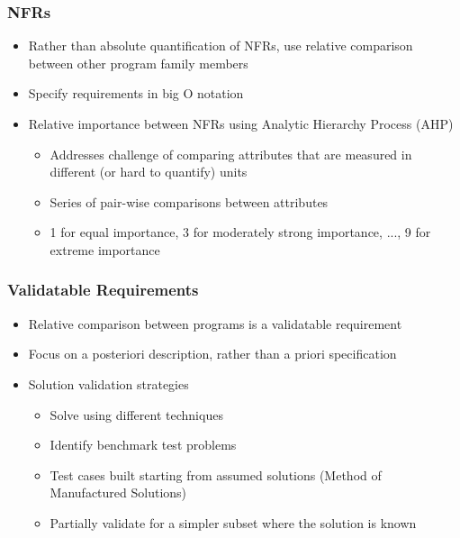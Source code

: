 \documentclass[t,12pt,numbers,fleqn]{beamer}
\begin{document}
\begin{frame}

\frametitle{NFRs}

\begin{itemize}

\item Rather than absolute quantification of NFRs, use relative comparison between other program family members
\item Specify requirements in big O notation
\item Relative importance between NFRs using Analytic Hierarchy Process (AHP) \cite{Saaty1980}
\begin{itemize}
\item Addresses challenge of comparing attributes that are measured in different (or hard to quantify) units
\item Series of pair-wise comparisons between attributes
\item 1 for equal importance, 3 for moderately strong importance, ..., 9 for extreme importance
\end{itemize}

\end{itemize}

\end{frame}


\begin{frame}

\frametitle{Validatable Requirements}

\begin{itemize}

\item Relative comparison between programs is a validatable requirement
\item Focus on a posteriori description, rather than a priori specification
\item Solution validation strategies
\begin{itemize}
\item Solve using different techniques
\item Identify benchmark test problems %
\item Test cases built starting from assumed solutions (Method of Manufactured Solutions)
\item Partially validate for a simpler subset where the solution is known
\end{itemize}

\end{itemize}

\end{frame}
\end{document}
